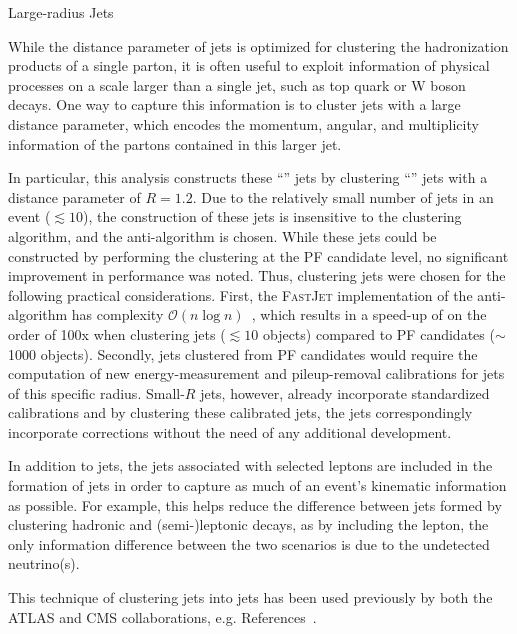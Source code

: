 \begin{section}{Large-radius Jets}

While the distance parameter of \smallR jets is optimized for clustering the hadronization products of a single parton, it is often useful to exploit information of physical processes on a scale larger than a single jet, such as top quark or W boson decays.
One way to capture this information is to cluster jets with a large distance parameter, which encodes the momentum, angular, and multiplicity information of the partons contained in this larger jet.

In particular, this analysis constructs these ``\largeR'' jets by clustering ``\smallR'' jets with a distance parameter of $R = 1.2$.
Due to the relatively small number of \smallR jets in an event ($\lesssim 10$), the construction of these \largeR jets is insensitive to the clustering algorithm, and the anti-\kT algorithm is chosen.
While these \largeR jets could be constructed by performing the clustering at the PF candidate level, no significant improvement in performance was noted.
Thus, clustering \smallR jets were chosen for the following practical considerations.
First, the \textsc{FastJet} implementation of the anti-\kT algorithm has complexity $\mathcal{O}(n\log n)$~\cite{Cacciari:2005hq}, which results in a speed-up of on the order of 100x when clustering \smallR jets ($\lesssim 10$ objects) compared to PF candidates ($\sim$1000 objects).
Secondly, \largeR jets clustered from PF candidates would require the computation of new energy-measurement and pileup-removal calibrations for jets of this specific radius.
Small-$R$ jets, however, already incorporate standardized calibrations and by clustering these calibrated \smallR jets, the \largeR jets correspondingly incorporate corrections without the need of any additional development.

In addition to \smallR jets, the jets associated with selected leptons are included in the formation of \largeR jets in order to capture as much of an event's kinematic information as possible.
For example, this helps reduce the difference between \largeR jets formed by clustering hadronic and (semi-)leptonic decays, as by including the lepton, the only information difference between the two scenarios is due to the undetected neutrino(s).

This technique of clustering \smallR jets into \largeR jets has been used previously by both the ATLAS and CMS collaborations, e.g. References~\cite{Aaboud:2017aeu,Khachatryan:2016uwr}.


\end{section}
